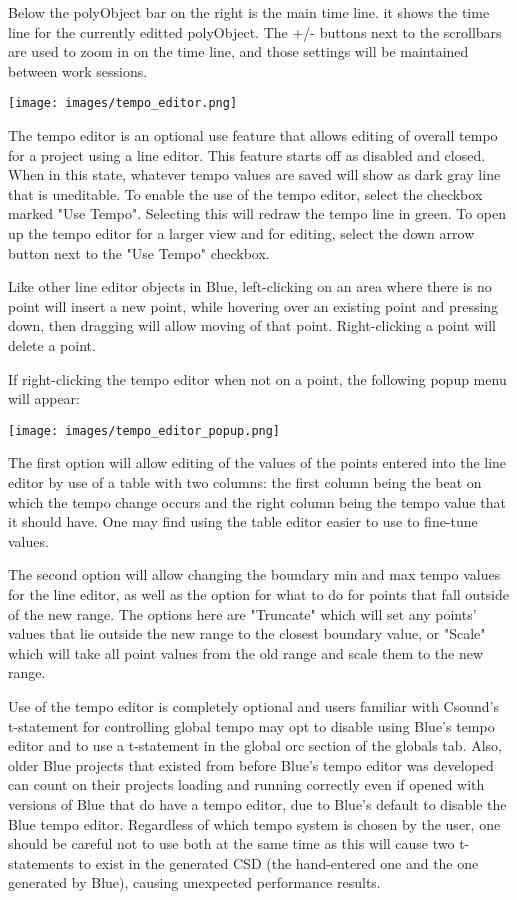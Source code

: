 Below the polyObject bar on the right is the main time line. it shows
the time line for the currently editted polyObject. The +/- buttons next
to the scrollbars are used to zoom in on the time line, and those
settings will be maintained between work sessions.

\texttt{[image: images/tempo\_editor.png]}

The tempo editor is an optional use feature that allows editing of
overall tempo for a project using a line editor. This feature starts off
as disabled and closed. When in this state, whatever tempo values are
saved will show as dark gray line that is uneditable. To enable the use
of the tempo editor, select the checkbox marked "Use Tempo". Selecting
this will redraw the tempo line in green. To open up the tempo editor
for a larger view and for editing, select the down arrow button next to
the "Use Tempo" checkbox.

Like other line editor objects in Blue, left-clicking on an area where
there is no point will insert a new point, while hovering over an
existing point and pressing down, then dragging will allow moving of
that point. Right-clicking a point will delete a point.

If right-clicking the tempo editor when not on a point, the following
popup menu will appear:

\texttt{[image: images/tempo\_editor\_popup.png]}

The first option will allow editing of the values of the points entered
into the line editor by use of a table with two columns: the first
column being the beat on which the tempo change occurs and the right
column being the tempo value that it should have. One may find using the
table editor easier to use to fine-tune values.

The second option will allow changing the boundary min and max tempo
values for the line editor, as well as the option for what to do for
points that fall outside of the new range. The options here are
"Truncate" which will set any points' values that lie outside the new
range to the closest boundary value, or "Scale" which will take all
point values from the old range and scale them to the new range.

Use of the tempo editor is completely optional and users familiar with
Csound's t-statement for controlling global tempo may opt to disable
using Blue's tempo editor and to use a t-statement in the global orc
section of the globals tab. Also, older Blue projects that existed from
before Blue's tempo editor was developed can count on their projects
loading and running correctly even if opened with versions of Blue that
do have a tempo editor, due to Blue's default to disable the Blue tempo
editor. Regardless of which tempo system is chosen by the user, one
should be careful not to use both at the same time as this will cause
two t-statements to exist in the generated CSD (the hand-entered one and
the one generated by Blue), causing unexpected performance results.

